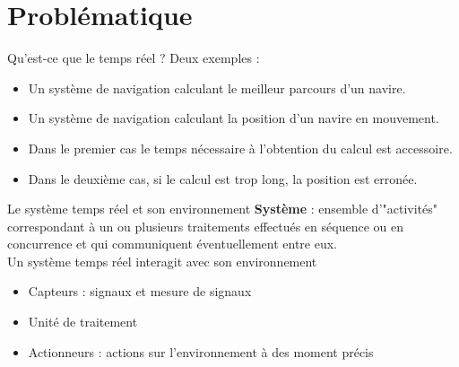 %
%
%

\part{Problématique}



\begin{frame}{Qu'est-ce que le temps réel ?}
  Deux exemples :
  \begin{itemize}
  \item Un  système de navigation calculant le  meilleur parcours d'un
    navire.
  \item Un système de navigation  calculant la position d'un navire en
    mouvement.
  \end{itemize}
  \begin{itemize}
  \item  Dans le  premier cas  le  temps nécessaire  à l'obtention  du
    calcul est accessoire.
  \item Dans le deuxième cas, si  le calcul est trop long, la position
    est erronée.
  \end{itemize}
\end{frame}

\begin{frame}{Le système temps réel et son environnement}
  \textbf{Système}  :  ensemble d'"activités"  correspondant  à un  ou
  plusieurs traitements effectués en séquence ou en concurrence et qui
  communiquent  éventuellement entre eux.\\[3mm]

  Un système temps réel interagit avec son environnement
  \begin{itemize}
  \item Capteurs : signaux et mesure de signaux
  \item Unité de traitement
  \item Actionneurs : actions sur l'environnement à des moment précis
  \end{itemize}
\end{frame}

